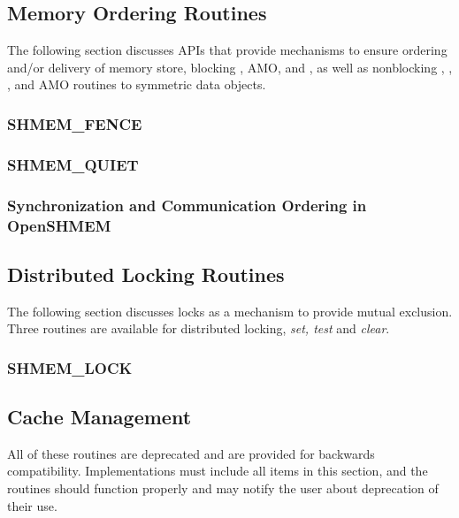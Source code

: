 \documentclass[10pt]{book}
\begin{document}
\subsection{Memory Ordering Routines}\label{subsec:memory_order}
The following section discusses \openshmem \acp{API} that provide mechanisms to
ensure ordering and/or delivery of memory store, blocking , \ac{AMO},
and , as well as nonblocking \PUT{},
, \GET{}, and \ac{AMO} routines to symmetric data
objects.

\subsubsection{\textbf{SHMEM\_FENCE}}\label{subsec:shmem_fence}


\subsubsection{\textbf{SHMEM\_QUIET}}\label{subsec:shmem_quiet}


\subsubsection{Synchronization and Communication Ordering in OpenSHMEM}







\subsection{Distributed Locking Routines}
The following section discusses \openshmem locks as a mechanism to provide
mutual exclusion. Three routines are available for distributed locking,
\textit{set, test} and \textit{clear}.

\subsubsection{\textbf{SHMEM\_LOCK}}\label{subsec:shmem_lock}






\subsection{Cache Management}
All of these routines are deprecated and are provided for backwards
compatibility.  Implementations must include all items in this section, and the
routines should function properly and may notify the user about deprecation of
their use.
\end{document}
